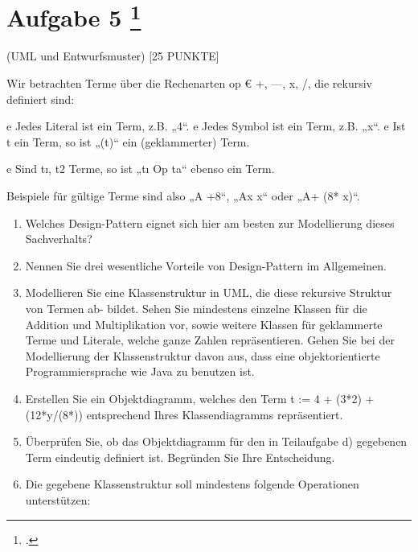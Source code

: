 \documentclass{lehramt-informatik-aufgabe}
\begin{document}
\liAufgabenTitel{}
\section{Aufgabe 5
\footcite{66116:2020:09}}

 (UML und Entwurfsmuster) [25 PUNKTE]

Wir betrachten Terme über die Rechenarten op € {+, —, x, /}, die rekursiv definiert sind:

e Jedes Literal ist ein Term, z.B. „4“.
e Jedes Symbol ist ein Term, z.B. „x“.
e Ist t ein Term, so ist „(t)“ ein (geklammerter) Term.

e Sind tı, t2 Terme, so ist „tı Op ta“ ebenso ein Term.

Beispiele für gültige Terme sind also „A +8“, „Ax x“ oder „A+ (8* x)“.
\begin{enumerate}


\item Welches Design-Pattern eignet sich hier am besten zur Modellierung dieses Sachverhalts?

\item Nennen Sie drei wesentliche Vorteile von Design-Pattern im Allgemeinen.


\item Modellieren Sie eine Klassenstruktur in UML, die diese rekursive Struktur von Termen ab-
bildet. Sehen Sie mindestens einzelne Klassen für die Addition und Multiplikation vor, sowie
weitere Klassen für geklammerte Terme und Literale, welche ganze Zahlen repräsentieren.
Gehen Sie bei der Modellierung der Klassenstruktur davon aus, dass eine objektorientierte
Programmiersprache wie Java zu benutzen ist.


\item Erstellen Sie ein Objektdiagramm, welches den Term t := 4 + (3*2) + (12*y/(8*))
entsprechend Ihres Klassendiagramms repräsentiert.


\item Überprüfen Sie, ob das Objektdiagramm für den in Teilaufgabe d)
gegebenen Term eindeutig definiert ist. Begründen Sie Ihre Entscheidung.


\item Die gegebene Klassenstruktur soll mindestens folgende Operationen unterstützen:


\end{enumerate}
\end{document}
